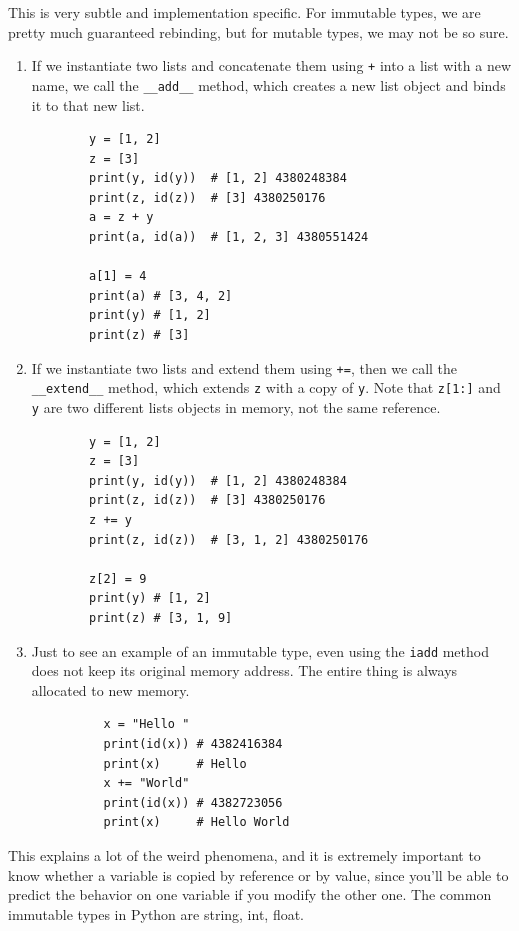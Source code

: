   \begin{example}[Warning]
    \label{ex:warning}
    This is very subtle and implementation specific. For immutable types, we are pretty much guaranteed rebinding, but for mutable types, we may not be so sure.  
    \begin{enumerate}
      \item If we instantiate two lists and concatenate them using \texttt{+} into a list with a new name, we call the \texttt{\_\_add\_\_} method, which creates a new list object and binds it to that new list.  
      \begin{lstlisting}
        y = [1, 2]
        z = [3]
        print(y, id(y))  # [1, 2] 4380248384
        print(z, id(z))  # [3] 4380250176
        a = z + y
        print(a, id(a))  # [1, 2, 3] 4380551424

        a[1] = 4
        print(a) # [3, 4, 2]
        print(y) # [1, 2]
        print(z) # [3]
      \end{lstlisting}

      \item If we instantiate two lists and extend them using \texttt{+=}, then we call the \texttt{\_\_extend\_\_} method, which extends \texttt{z} with a copy of \texttt{y}. Note that \texttt{z[1:]} and \texttt{y} are two different lists objects in memory, not the same reference. 
      \begin{lstlisting}
        y = [1, 2]
        z = [3]
        print(y, id(y))  # [1, 2] 4380248384
        print(z, id(z))  # [3] 4380250176
        z += y
        print(z, id(z))  # [3, 1, 2] 4380250176

        z[2] = 9
        print(y) # [1, 2]
        print(z) # [3, 1, 9]
      \end{lstlisting}

      \item Just to see an example of an immutable type, even using the \texttt{iadd} method does not keep its original memory address. The entire thing is always allocated to new memory. 
        \begin{lstlisting}
          x = "Hello " 
          print(id(x)) # 4382416384
          print(x)     # Hello
          x += "World"
          print(id(x)) # 4382723056
          print(x)     # Hello World
        \end{lstlisting}
    \end{enumerate}
  \end{example}

  This explains a lot of the weird phenomena, and it is extremely important to know whether a variable is copied by reference or by value, since you'll be able to predict the behavior on one variable if you modify the other one. The common immutable types in Python are string, int, float.


